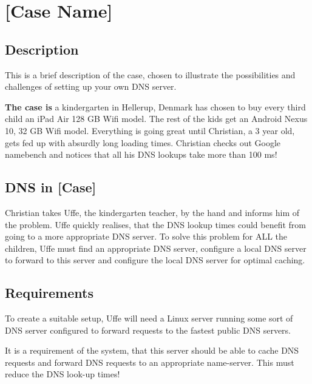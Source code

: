 \chapter{[Case Name]}
\section{Description}
This is a brief description of the case, chosen to illustrate the possibilities and challenges of setting up your own DNS server.

\textbf{The case is}
a kindergarten in Hellerup, Denmark has chosen to buy every third child an iPad Air 128 GB Wifi model. The rest of the kids get an Android Nexus 10, 32 GB Wifi model. Everything is going great until Christian, a 3 year old, gets fed up with absurdly long loading times. Christian checks out Google namebench and notices that all his DNS lookups take more than 100 ms!

\section{DNS in [Case]}

Christian takes Uffe, the kindergarten teacher, by the hand and informs him of the problem. Uffe quickly realises, that the DNS lookup times could benefit from going to a more appropriate DNS server. To solve this problem for ALL the children, Uffe must find an appropriate DNS server, configure a local DNS server to forward to this server and configure the local DNS server for optimal caching.


\section{Requirements}
To create a suitable setup, Uffe will need a Linux server running some sort of DNS server configured to forward requests to the fastest public DNS servers.

It is a requirement of the system, that this server should be able to cache DNS requests and forward DNS requests to an appropriate name-server.
This must reduce the DNS look-up times!
